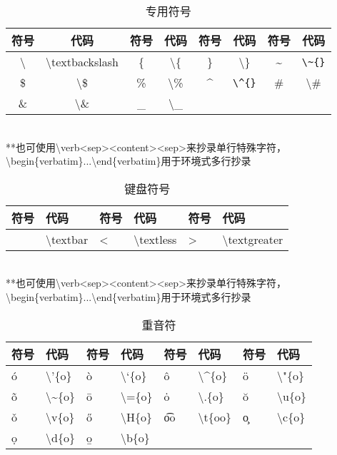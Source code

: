 \documentclass[UTF8,fontset=ubuntu]{ctexart}
\begin{document}
\begin{table}[H]
\begin{tabular}{c c c c c c c c}
	\hline
	符号 & 代码 & 符号 & 代码 & 符号 & 代码 & 符号 & 代码\\
	\hline
	\textbackslash & \textbackslash textbackslash & \{ & \textbackslash\{ & \} & \textbackslash\} & \~{} & \verb|\~{}|\\
	\$ & \textbackslash\$ & \% & \textbackslash\% & \^{} & \verb|\^{}| & \# & \textbackslash\#\\
	\& & \textbackslash\& & \_ & \textbackslash\_\\
	\hline
\end{tabular}\\[2mm]
\RaggedRight
**也可使用\textbackslash verb\textless sep\textgreater\textless content\textgreater\textless sep\textgreater 来抄录单行特殊字符，\textbackslash begin\{verbatim\}...\textbackslash end\{verbatim\}用于环境式多行抄录\\
\caption{专用符号}
\end{table}

\begin{table}[H]
\begin{tabular}{l l l l l l}
	\hline
	符号 & 代码 & 符号 & 代码 & 符号 & 代码\\
	\hline
	\textbar & \textbackslash textbar & \textless & \textbackslash textless & \textgreater & \textbackslash textgreater\\
	\hline
\end{tabular}\\[2mm]
\RaggedRight
**也可使用\textbackslash verb\textless sep\textgreater\textless content\textgreater\textless sep\textgreater 来抄录单行特殊字符，\textbackslash begin\{verbatim\}...\textbackslash end\{verbatim\}用于环境式多行抄录\\
\caption{键盘符号}
\end{table}

\begin{table}[H]
\begin{tabular}{l l l l l l l l}
	\hline
	符号 & 代码 & 符号 & 代码 & 符号 & 代码 & 符号 & 代码\\
	\hline
	\'{o} & \textbackslash'\{o\} & \`{o} & \textbackslash`\{o\} & \^{o} & \textbackslash\^{}\{o\} & \"{o} & \textbackslash"\{o\}\\
	\~{o} & \textbackslash\~{}\{o\} & \={o} & \textbackslash=\{o\} & \.{o} & \textbackslash.\{o\} & \u{o} & \textbackslash u\{o\}\\
	\v{o} & \textbackslash v\{o\} & \H{o} & \textbackslash H\{o\} & \t{oo} & \textbackslash t\{oo\} & \c{o} & \textbackslash c\{o\}\\
	\d{o} & \textbackslash d\{o\} & \b{o} & \textbackslash b\{o\}\\
	\hline
\end{tabular}
\caption{重音符}
\end{table}
\end{document}
